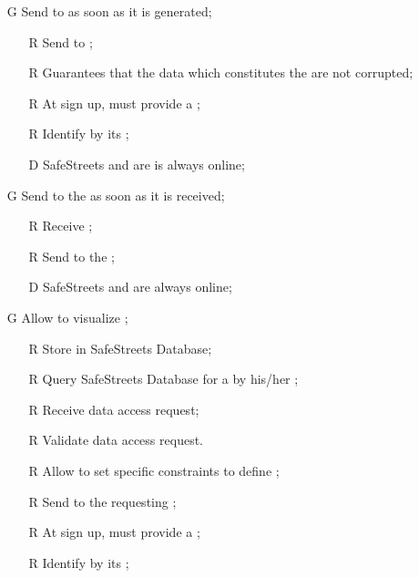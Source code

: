 \documentclass[../../../rasd.tex]{subfiles}
\begin{document}
\begin{itemize}
	\item[G\subs{2}]Send  to  as soon as it is generated;
	\begin{itemize}
		\item[R\subs{11}]Send  to ;
		\item[R\subs{15}]Guarantees that the data which constitutes the  are not corrupted;
		\item[R\subs{31}]At sign up,  must provide a ;
		\item[R\subs{32}]Identify  by its ;
		\\
		\item[D\subs{6}]SafeStreets and  are is always online;	
	\end{itemize}

	\item[G\subs{3}]Send  to the  as soon as it is received;
	\begin{itemize}
		\item[R\subs{4}]Receive ;
		\item[R\subs{7}]Send  to the ;
		\\
		\item[D\subs{6}]SafeStreets and  are always online;
	\end{itemize}

	\item[G\subs{4}]Allow  to visualize ;
	\begin{itemize}
		\item[R\subs{10}]Store  in SafeStreets Database;
		\item[R\subs{13}]Query SafeStreets Database for a  by his/her ;
		\item[R\subs{16}]Receive  data access request;
		\item[R\subs{17}]Validate  data access request.
		\item[R\subs{18}]Allow  to set specific constraints to define ;
		\item[R\subs{19}]Send  to the requesting ;
		\item[R\subs{31}]At sign up,  must provide a ;
		\item[R\subs{32}]Identify  by its ;
	\end{itemize}


\end{itemize}
\end{document}
